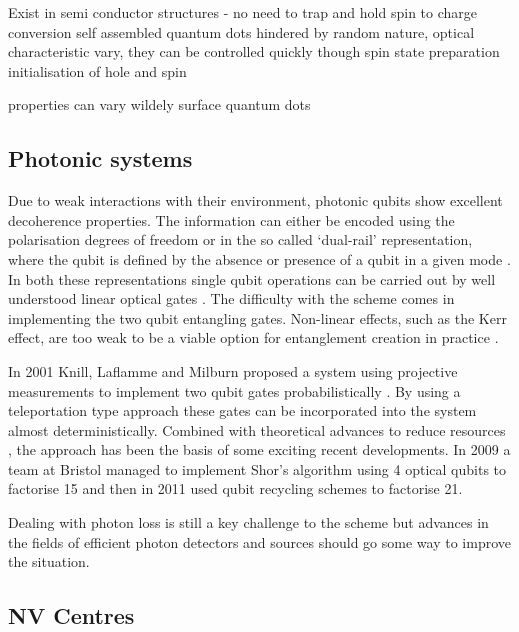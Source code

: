 Exist in semi conductor structures - no need to trap and hold
spin to charge conversion
\cite{quantum_dot_review_07}
self assembled quantum dots hindered by random nature, optical characteristic vary, they can be controlled quickly though
\cite{atature_quantum_dot_06} spin state preparation
\cite{gerardot_dot_08} initialisation of hole and spin
\cite{quantum_dot_control_08}
\cite{quantum_dot_measurement_06}

properties can vary wildely
surface quantum dots

\subsection{Photonic systems}

Due to weak interactions with their environment, photonic qubits show excellent decoherence properties. The information can either be encoded using the polarisation degrees of freedom or in the so called `dual-rail’ representation, where the qubit is defined by the absence or presence of a qubit in a given mode \cite{loqc_review_07}. In both these representations single qubit operations can be carried out by well understood linear optical gates \cite{fox_quantum_optics, walls_milburn_optics}. The difficulty with the scheme comes in implementing the two qubit entangling gates. Non-linear effects, such as the Kerr effect, are too weak to be a viable option for entanglement creation in practice \cite{kerr_too_weak}.

In 2001 Knill, Laflamme and Milburn proposed a system using projective measurements to implement two qubit gates probabilistically \cite{klm}. By using a teleportation type approach these gates can be incorporated into the system almost deterministically. Combined with theoretical advances to reduce resources \cite{science_loqc_review}, the approach has been the basis of some exciting recent developments. In 2009 a team at Bristol managed to implement Shor's algorithm using 4 optical qubits to factorise 15 \cite{shor_chip_bristol} and then in 2011 used qubit recycling schemes to factorise 21.  

Dealing with photon loss is still a key challenge to the scheme but advances in the fields of efficient photon detectors \cite{single_photon_detector_review_09} and sources \cite{single_photon_source_review_04} should go some way to improve the situation.

\subsection{NV Centres}

